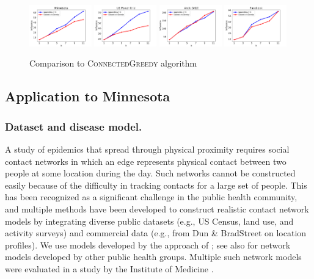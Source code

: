\begin{figure}
\centering
\includegraphics[width=0.24\textwidth]{img/baseline-mn-blkgrp.pdf}
\includegraphics[width=0.24\textwidth]{img/baseline-USpowergrid.pdf}
\includegraphics[width=0.24\textwidth]{img/baseline-ca-GrQC.pdf}
\includegraphics[width=0.24\textwidth]{img/baseline-facebook.pdf}\\
\caption{Comparison to \textsc{ConnectedGreedy} algorithm}
\label{fig:compare-greedy}
\end{figure}

\subsection{Application to Minnesota}
\subsubsection{Dataset and disease model.}
\label{sec:data}
A study of epidemics that spread through physical proximity requires social contact networks in which an edge represents physical contact
between two people at some location during the day. Such networks cannot be constructed easily because of the difficulty in tracking contacts for a large set of people.
This has been recognized as a significant challenge in the public health community,
and multiple methods have been developed to construct realistic contact
network models by integrating diverse public datasets
(e.g., US Census, land use, and activity surveys) and
commercial data (e.g., from Dun \& BradStreet on location profiles).
We use models developed by the approach of 
\cite{eubank:nature04}; %
see also \cite{longini05:science,fc+06} for network
models developed by other public health groups. %
Multiple such network models were evaluated in a study by the Institute of Medicine
\cite{halloran:pnas08}.

